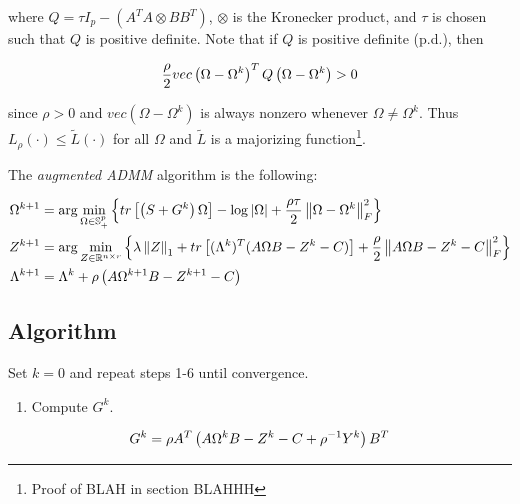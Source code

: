 \documentclass[11pt,]{report}
\providecommand{\tightlist}{%
  \setlength{\itemsep}{0pt}\setlength{\parskip}{0pt}}
\begin{document}
where \(Q = \tau I_{p} - \left(A^{T}A \otimes BB^{T}\right)\), \(\otimes\) is the Kronecker product, and \(\tau\) is chosen such that \(Q\) is positive definite. Note that if \(Q\) is positive definite (p.d.), then

\begin{equation}
\frac{\rho}{2}vec\left(\Omega - \Omega^{k} \right)^{T}Q\left(\Omega - \Omega^{k} \right) > 0
\label{eq:pd}\notag
\end{equation}

since \(\rho > 0\) and \(vec\left(\Omega - \Omega^{k}\right)\) is always nonzero whenever \(\Omega \neq \Omega^{k}\). Thus \(L_{\rho}\left(\cdot\right) \leq \tilde{L}\left(\cdot\right)\) for all \(\Omega\) and \(\tilde{L}\) is a majorizing function\footnote{Proof of BLAH in section BLAHHH}.

The \emph{augmented ADMM} algorithm is the following:

\begin{align}
  \Omega^{k + 1} &= \arg\min_{\Omega \in \mathbb{S}_{+}^{p}}\left\{tr\left[\left(S + G^{k}\right)\Omega\right] - \log\left|\Omega\right| + \frac{\rho\tau}{2}\left\|\Omega - \Omega^{k}\right\|_{F}^{2} \right\} \label{eq:omegaaugadmm}\notag \\
  Z^{k + 1} &= \arg\min_{Z \in \mathbb{R}^{n \times r}}\left\{\lambda\left\|Z\right\|_{1} + tr\left[(\Lambda^{k})^{T}(A\Omega B - Z^{k} - C) \right] + \frac{\rho}{2}\left\|A\Omega B - Z^{k} - C \right\|_{F}^{2} \right\} \label{eq:ZZaugadmm}\notag \\
  \Lambda^{k + 1} &= \Lambda^{k} + \rho\left(A\Omega^{k + 1}B - Z^{k + 1} - C \right) \label{eq:lamaugadmm}\notag
\end{align}

\hypertarget{algorithm-1}{%
\subsection{Algorithm}\label{algorithm-1}}

Set \(k = 0\) and repeat steps 1-6 until convergence.

\begin{enumerate}
\def\labelenumi{\arabic{enumi}.}
\tightlist
\item
  Compute \(G^{k}\).
\end{enumerate}

\begin{equation}
G^{k} = \rho A^{T}\left( A\Omega^{k} B - Z^{k} - C + \rho^{-1}Y^{k} \right)B^{T}
\label{eq:Gk}\notag
\end{equation}
\end{document}
